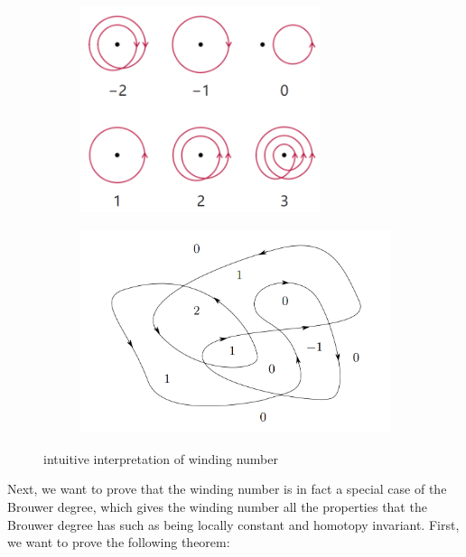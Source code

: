 \documentclass[11pt]{article}
\numberwithin{equation}{section} \numberwithin{theorem}{section}
\numberwithin{lemma}{section} \numberwithin{remark}{section}
\numberwithin{table}{section} \numberwithin{corollary}{section}
\numberwithin{example}{section} \numberwithin{conjecture}{section}
\numberwithin{assumption}{section}
\numberwithin{definition}{section}
\numberwithin{proposition}{section}
\begin{document}
\begin{figure}[H]
\begin{subfigure}{0.5\textwidth}
\includegraphics[width=0.9\linewidth, height=6cm]{image/windingnumber2.png} 
\caption{}
\end{subfigure}
\begin{subfigure}{0.5\textwidth}
\includegraphics[width=0.9\linewidth, height=6cm]{image/windingnumber1.png}
\caption{}
\end{subfigure}
\caption{intuitive interpretation of winding number}
\end{figure}
Next, we want to prove that the winding number is in fact a special case of the Brouwer degree, which gives the winding number all the properties that the Brouwer degree has such as being locally constant and homotopy invariant.
First, we want to prove the following theorem:
\end{document}
